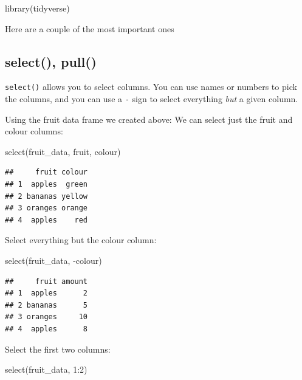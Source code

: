 \documentclass[
]{book}
\newenvironment{Shaded}{\begin{snugshade}}{\end{snugshade}}
\newcommand{\DecValTok}[1]{\textcolor[rgb]{0.00,0.00,0.81}{#1}}
\newcommand{\FunctionTok}[1]{\textcolor[rgb]{0.00,0.00,0.00}{#1}}
\newcommand{\NormalTok}[1]{#1}
\newcommand{\SpecialCharTok}[1]{\textcolor[rgb]{0.00,0.00,0.00}{#1}}
\begin{document}
\begin{Shaded}
\begin{Highlighting}[]
\FunctionTok{library}\NormalTok{(tidyverse)}
\end{Highlighting}
\end{Shaded}

Here are a couple of the most important ones

\hypertarget{select-pull}{%
\subsection{select(), pull()}\label{select-pull}}

\texttt{select()} allows you to select columns. You can use names or numbers to pick the columns, and you can use a \texttt{-} sign to select everything \emph{but} a given column.

Using the fruit data frame we created above: We can select just the fruit and colour columns:

\begin{Shaded}
\begin{Highlighting}[]
\FunctionTok{select}\NormalTok{(fruit\_data, fruit, colour)}
\end{Highlighting}
\end{Shaded}

\begin{verbatim}
##     fruit colour
## 1  apples  green
## 2 bananas yellow
## 3 oranges orange
## 4  apples    red
\end{verbatim}

Select everything but the colour column:

\begin{Shaded}
\begin{Highlighting}[]
\FunctionTok{select}\NormalTok{(fruit\_data, }\SpecialCharTok{{-}}\NormalTok{colour)}
\end{Highlighting}
\end{Shaded}

\begin{verbatim}
##     fruit amount
## 1  apples      2
## 2 bananas      5
## 3 oranges     10
## 4  apples      8
\end{verbatim}

Select the first two columns:

\begin{Shaded}
\begin{Highlighting}[]
\FunctionTok{select}\NormalTok{(fruit\_data, }\DecValTok{1}\SpecialCharTok{:}\DecValTok{2}\NormalTok{)}
\end{Highlighting}
\end{Shaded}
\end{document}
